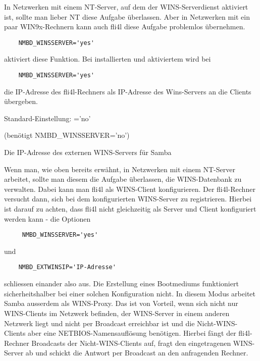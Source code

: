 \begin{description}
    In Netzwerken mit einem NT-Server, auf dem der WINS-Serverdienst
    aktiviert ist, sollte man lieber NT diese Aufgabe überlassen. Aber in
    Netzwerken mit ein paar WIN9x-Rechnern kann auch fli4l diese Aufgabe
    problemlos übernehmen.

\begin{example}
\begin{verbatim}
    NMBD_WINSSERVER='yes'
\end{verbatim}
\end{example}

    aktiviert diese Funktion.
    Bei installierten und aktiviertem  wird bei
\begin{example}
\begin{verbatim}
    NMBD_WINSSERVER='yes'
\end{verbatim}
\end{example}

    die IP-Adresse des fli4l-Rechners als IP-Adresse des Wins-Servers an die
    Clients übergeben.

    Standard-Einstellung: ='no'


 (benötigt NMBD\_WINSSERVER='no')

    Die IP-Adresse des externen WINS-Servers für Samba

    Wenn man, wie oben bereits erwähnt, in Netzwerken mit einem NT-Server
    arbeitet, sollte man diesem die Aufgabe überlassen, die WINS-Datenbank
    zu verwalten. Dabei kann man fli4l als WINS-Client konfigurieren. Der
    fli4l-Rechner versucht dann, sich bei dem konfigurierten WINS-Server zu
    registrieren. Hierbei ist darauf zu achten, dass fli4l nicht
    gleichzeitig als Server und Client konfiguriert werden kann - die
    Optionen

\begin{example}
\begin{verbatim}
     NMBD_WINSSERVER='yes'
\end{verbatim}
\end{example}

    und

\begin{example}
\begin{verbatim}
    NMBD_EXTWINSIP='IP-Adresse'
\end{verbatim}
\end{example}

    schliessen einander also aus. Die Erstellung eines Bootmediums funktioniert
    sicherheitshalber bei einer solchen Konfiguration nicht.
    In diesem Modus arbeitet Samba ausserdem als WINS-Proxy. Das ist von
    Vorteil, wenn sich nicht nur WINS-Clients im Netzwerk befinden, der
    WINS-Server in einem anderen Netzwerk liegt und nicht per Broadcast
    erreichbar ist und die Nicht-WINS-Clients aber eine
    NETBIOS-Namensauflösung benötigen. Hierbei fängt der fli4l-Rechner
    Broadcasts der Nicht-WINS-Clients auf, fragt den eingetragenen
    WINS-Server ab und schickt die Antwort per Broadcast an den
    anfragenden Rechner.


\end{description}
